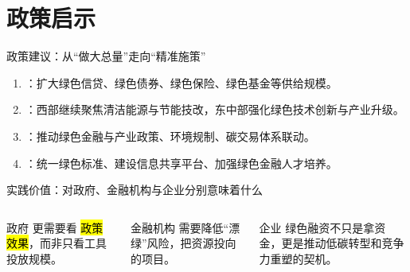 \section{政策启示}

\begin{frame}{政策建议：从“做大总量”走向“精准施策”}
  \begin{enumerate}
    \item {}：扩大绿色信贷、绿色债券、绿色保险、绿色基金等供给规模。
    \item {}：西部继续聚焦清洁能源与节能技改，东中部强化绿色技术创新与产业升级。
    \item {}：推动绿色金融与产业政策、环境规制、碳交易体系联动。
    \item {}：统一绿色标准、建设信息共享平台、加强绿色金融人才培养。
  \end{enumerate}
\end{frame}

\begin{frame}{实践价值：对政府、金融机构与企业分别意味着什么}
  \begin{columns}[T,onlytextwidth]
    \begin{block}{政府}
      更需要看 \hl{政策效果}，而非只看工具投放规模。
    \end{block}

    \begin{exampleblock}{金融机构}
      需要降低“漂绿”风险，把资源投向  的项目。
    \end{exampleblock}

    \begin{alertblock}{企业}
      绿色融资不只是拿资金，更是推动低碳转型和竞争力重塑的契机。
    \end{alertblock}
  \end{columns}
\end{frame}
